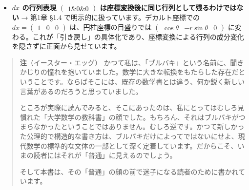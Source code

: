 \documentclass[a4paper,12pt,openany]{book}
\begin{document}
\begin{itemize}
\item
  \textbf{$dx$ の行列表現 $\begin{pmatrix}1\&0\&0\end{pmatrix}$ は座標変換後に同じ行列として残るわけではない}
  → 第1章 §1.4 で明示的に扱っています。デカルト座標での
  \(dx = \begin{pmatrix}1&0&0\end{pmatrix}\) は、円柱座標の目盛りでは
  \(\begin{pmatrix}\cos\theta & -r\sin\theta & 0\end{pmatrix}\)
  に変わる。これが「引き戻し」の具体化であり、座標変換による行列の成分変化を隠さずに正面から見せています。
\end{itemize}

\par\vspace{0.35em}\par

\begin{quote}
\textbf{注}（イースター・エッグ）
かつて私は、「ブルバキ」という名前に、聞きかじりの憧れを抱いていました。数学に大きな転換をもたらした存在だということです。ならばそこには、既存の数学書とは違う、何か鋭く新しい言葉があるのだろうと思っていました。

ところが実際に読んでみると、そこにあったのは、私にとってはむしろ見慣れた「大学数学の教科書」の顔でした。もちろん、それはブルバキがつまらなかったということではありません。むしろ逆です。かつて新しかった公理的で構造的な書き方は、ブルバキだけによってではないにせよ、現代数学の標準的な文体の一部として深く定着しています。だからこそ、いまの読者にはそれが「普通」に見えるのでしょう。

そして本書は、その「普通」の顔の前で迷子になる読者のために書かれています。
\end{quote}
\end{document}
